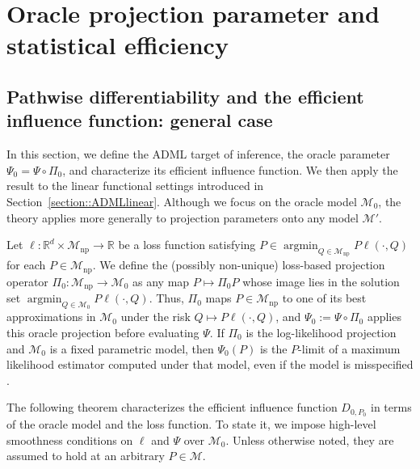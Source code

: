 \documentclass[11pt]{article}
\DeclareMathOperator*{\argmin}{argmin}
\theoremstyle{definition}
\begin{document}
 
 
 



\section{Oracle projection parameter and statistical efficiency}
\label{section::oracleparameter}

\subsection{Pathwise differentiability and the efficient influence function: general case}

In this section, we define the ADML target of inference, the oracle parameter \(\Psi_0 = \Psi \circ \Pi_0\), and characterize its efficient influence function. We then apply the result to the linear functional settings introduced in Section~\ref{section::ADMLlinear}. Although we focus on the oracle model \(\mathcal{M}_0\), the theory applies more generally to projection parameters onto any model \(\mathcal{M}'\).



  

Let $\ell:\mathbb{R}^d \times \mathcal{M}_{\mathrm{np}}\rightarrow\mathbb{R}$ be a loss function satisfying $P \in \argmin_{ Q \in \mathcal{M}_{\mathrm{np}}} P \ell(\cdot, Q)$ for each $P \in \mathcal{M}_{\mathrm{np}}$. We define the (possibly non-unique) loss-based projection operator $\Pi_0: \mathcal{M}_{\mathrm{np}}\rightarrow \mathcal{M}_0$ as any map $P \mapsto \Pi_0P$ whose image lies in the solution set $\argmin_{Q \in \mathcal{M}_0} P \ell(\cdot, Q)$. Thus, \(\Pi_0\) maps \(P \in \mathcal{M}_{\mathrm{np}}\) to one of its best approximations in \(\mathcal{M}_0\) under the risk \(Q \mapsto P \ell(\cdot, Q)\), and \(\Psi_0:=\Psi \circ \Pi_0\) applies this oracle projection before evaluating \(\Psi\). If \(\Pi_0\) is the log-likelihood projection and \(\mathcal{M}_0\) is a fixed parametric model, then \(\Psi_0(P)\) is the \(P\)-limit of a maximum likelihood estimator computed under that model, even if the model is misspecified \citep{white1982MLErobust, freedman2006MLErobust}. 


The following theorem characterizes the efficient influence function \(D_{0,P_0}\) in terms of the oracle model and the loss function. To state it, we impose high-level smoothness conditions on \(\ell\) and \(\Psi\) over \(\mathcal{M}_0\). Unless otherwise noted, they are assumed to hold at an arbitrary \(P \in \mathcal{M}\).
 
\end{document}
